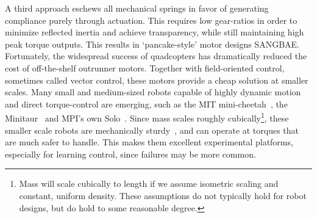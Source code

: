 A third approach eschews all mechanical springs in favor of generating compliance purely through actuation. This requires low gear-ratios in order to minimize reflected inertia and achieve transparency, while still maintaining high peak torque outputs. This results in `pancake-style' motor designs SANGBAE.
Fortunately, the widespread success of quadcopters has dramatically reduced the cost of off-the-shelf outrunner motors. Together with field-oriented control, sometimes called vector control, these motors provide a cheap solution at smaller scales. Many small and medium-sized robots capable of highly dynamic motion and direct torque-control are emerging, such as the MIT mini-cheetah~\cite{katz2019mini}, the Minitaur~\cite{kenneally2016design} and MPI's own Solo~\cite{grimminger2019open}. Since mass scales roughly cubically\footnote{Mass will scale cubically to length if we assume isometric scaling and constant, uniform density. These assumptions do not typically hold for robot designs, but do hold to some reasonable degree.}, these smaller scale robots are mechanically sturdy~\cite{biewener2005biomechanical}, and can operate at torques that are much safer to handle. This makes them excellent experimental platforms, especially for learning control, since failures may be more common.






